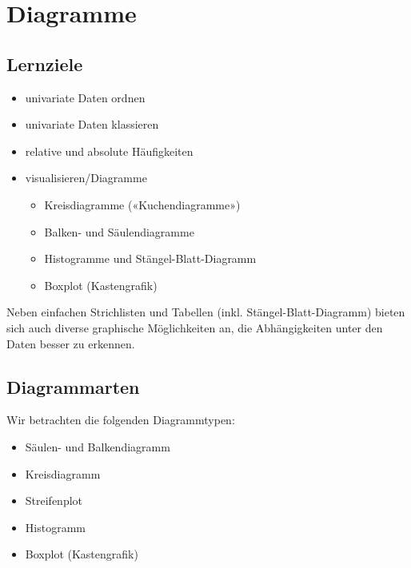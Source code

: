 
\section{Diagramme}

\subsection*{Lernziele}

\begin{itemize}
\item univariate Daten ordnen
\item univariate Daten klassieren
\item relative und absolute Häufigkeiten
\item visualisieren/Diagramme
  \begin{itemize}
  \item Kreisdiagramme («Kuchendiagramme»)
  \item Balken- und Säulendiagramme
  \item Histogramme und Stängel-Blatt-Diagramm
  \item Boxplot (Kastengrafik)
  \end{itemize}
\end{itemize}


Neben einfachen Strichlisten und Tabellen
(inkl. Stängel-Blatt-Diagramm) bieten sich auch diverse 
graphische Möglichkeiten an, die Abhängigkeiten unter den Daten besser
zu erkennen.

\subsection{Diagrammarten}

Wir betrachten die folgenden Diagrammtypen:
\begin{itemize}
 \item Säulen- und Balkendiagramm
 \item Kreisdiagramm
 \item Streifenplot
 \item Histogramm
 \item Boxplot (Kastengrafik)
\end{itemize}

